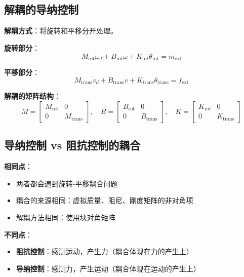 \documentclass[12pt,a4paper]{article}
\begin{document}
\subsection{解耦的导纳控制}

\textbf{解耦方式}：将旋转和平移分开处理。

\textbf{旋转部分}：
\begin{equation}
M_{\text{rot}}\dot{\omega}_d + B_{\text{rot}}\omega + K_{\text{rot}}\theta_{\text{rot}} = m_{\text{ext}}
\end{equation}

\textbf{平移部分}：
\begin{equation}
M_{\text{trans}}\dot{v}_d + B_{\text{trans}}v + K_{\text{trans}}\theta_{\text{trans}} = f_{\text{ext}}
\end{equation}

\textbf{解耦的矩阵结构}：
\begin{equation}
M = \begin{bmatrix}
M_{\text{rot}} & 0 \\
0 & M_{\text{trans}}
\end{bmatrix}, \quad
B = \begin{bmatrix}
B_{\text{rot}} & 0 \\
0 & B_{\text{trans}}
\end{bmatrix}, \quad
K = \begin{bmatrix}
K_{\text{rot}} & 0 \\
0 & K_{\text{trans}}
\end{bmatrix}
\end{equation}

\subsection{导纳控制 vs 阻抗控制的耦合}

\textbf{相同点}：
\begin{itemize}
\item 两者都会遇到旋转-平移耦合问题
\item 耦合的来源相同：虚拟质量、阻尼、刚度矩阵的非对角项
\item 解耦方法相同：使用块对角矩阵
\end{itemize}

\textbf{不同点}：
\begin{itemize}
\item \textbf{阻抗控制}：感测运动，产生力（耦合体现在力的产生上）
\item \textbf{导纳控制}：感测力，产生运动（耦合体现在运动的产生上）
\end{itemize}
\end{document}
